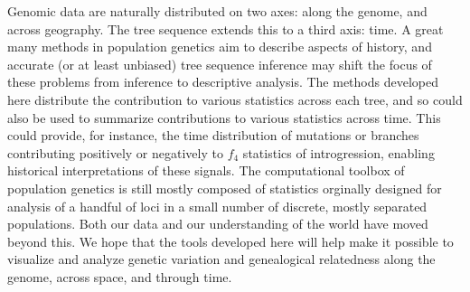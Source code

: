 \documentclass{article}
\begin{document}

Genomic data are naturally distributed on two axes: along the genome, and across geography.
The tree sequence extends this to a third axis: time.
A great many methods in population genetics aim to describe aspects of history,
and accurate (or at least unbiased) tree sequence inference
may shift the focus of these problems from inference to descriptive analysis.
The methods developed here distribute the contribution to various statistics across each tree,
and so could also be used to summarize contributions to various statistics across time.
This could provide, for instance, the time distribution of mutations or branches
contributing positively or negatively to $f_4$ statistics of introgression,
enabling historical interpretations of these signals.
The computational toolbox of population genetics
is still mostly composed of statistics orginally designed for analysis of a handful of loci
in a small number of discrete, mostly separated populations.
Both our data and our understanding of the world have moved beyond this.
We hope that the tools developed here will help make it possible
to visualize and analyze genetic variation and genealogical relatedness
along the genome, across space, and through time.

\end{document}
